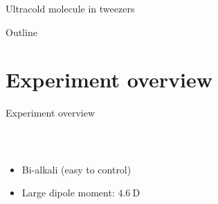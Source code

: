 \documentclass{beamer}
\begin{document}
\begin{frame}{Ultracold molecule in tweezers}
\begin{center}
  \end{center}
\end{frame}

\begin{frame}{Outline}
  \tableofcontents
\end{frame}

\section{Experiment overview}
\begin{frame}[t]{Experiment overview}
  \begin{columns}
    \column{5.8cm}
    \column{5.8cm}
    \begin{center}
      {}\\
      \begin{itemize}
      \item Bi-alkali (easy to control)
      \item Large dipole moment: $4.6\ \mathrm{D}$
      \end{itemize}
    \end{center}
  \end{columns}
\end{frame}

\end{document}
